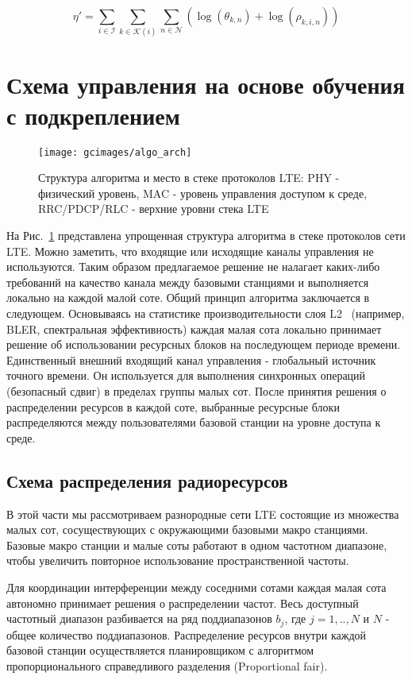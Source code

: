 \begin{equation}
\label{eq:maximizealt}
\eta' = \sum_{i \in \mathcal{I}} \sum_{k \in \mathcal{K}(i)} \sum_{n \in \mathcal{N}} (\log(\theta_{k,n}) + \log( \rho_{k,i,n}))
\end{equation}

\section{Схема управления на основе обучения с подкреплением}
\begin{figure}
    \centering
    \texttt{[image: gcimages/algo\_arch]}
    \caption{Структура алгоритма и место в стеке протоколов LTE: PHY - физический уровень, MAC - уровень управления доступом к среде, RRC/PDCP/RLC - верхние уровни стека LTE}
    \label{fig:algo_arch}
\end{figure}

На Рис.~\ref{fig:algo_arch} представлена упрощенная структура алгоритма в стеке протоколов сети LTE. Можно заметить, что входящие или исходящие каналы управления не используются. Таким образом предлагаемое решение не налагает каких-либо требований на качество канала между базовыми станциями и выполняется локально на каждой малой соте.
Общий принцип алгоритма заключается в следующем. Основываясь на статистике производительности слоя L2~\cite{TS36.300} (например, BLER, спектральная эффективность) каждая малая сота локально принимает решение об использовании ресурсных блоков на последующем периоде времени. Единственный внешний входящий канал управления - глобальный источник точного времени. Он используется для выполнения синхронных операций (безопасный сдвиг) в пределах группы малых сот. После принятия решения о распределении ресурсов в каждой соте, выбранные ресурсные блоки  распределяются между пользователями базовой станции на уровне доступа к среде.

\subsection{Схема распределения радиоресурсов}
В этой части мы рассмотриваем разнородные сети LTE состоящие из множества малых сот, сосуществующих с окружающими базовыми макро станциями. Базовые макро станции и малые соты работают в одном частотном диапазоне, чтобы увеличить повторное использование пространственной частоты.

Для координации интерференции между соседними сотами каждая малая сота автономно принимает решения о распределении частот. Весь доступный частотный диапазон разбивается на ряд поддиапазонов $b_{j}$, где $j=1, .., N$ и $N$ - общее количество поддиапазонов. Распределение ресурсов внутри каждой базовой станции осуществляется планировщиком с алгоритмом пропорционального справедливого разделения (Proportional fair).

